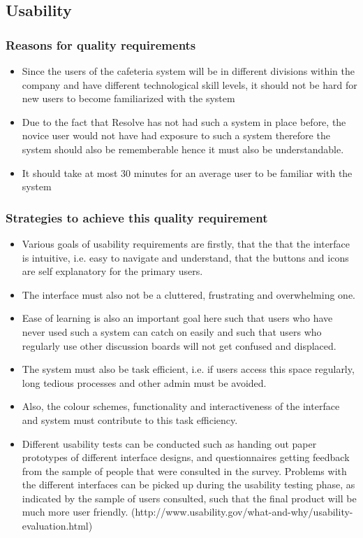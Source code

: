 \documentclass[a4paper,12pt]{article}
\begin{document}
\subsection{Usability}
 \subsubsection{Reasons for quality requirements}
 \begin{itemize}
 \item Since the users of the cafeteria system will be in different divisions within the company and have different technological skill levels, it should not be hard for new users to become familiarized with the system
 \item Due to the fact that Resolve has not had such a system in place before, the novice user would not have had exposure to such a system therefore the system should also be rememberable hence it must also be understandable. 
	\item It should take at most 30 minutes for an average user to be familiar with the system
 \end{itemize}
 \subsubsection{Strategies to achieve this quality requirement}
 \begin{itemize}
 \item Various goals of usability requirements are firstly, that the that the interface is intuitive, i.e. easy to navigate and understand, that the buttons and icons are self explanatory for the primary users.
 \item The interface must also not be a cluttered, frustrating and overwhelming one. 
 \item Ease of learning is also an important goal here such that users who have never used such a system can catch on easily and such that users who regularly use other discussion boards will not get confused and displaced. 
 \item The system must also be task efficient, i.e. if users access this space regularly, long tedious processes and other admin must be avoided.
\item Also, the colour schemes, functionality and interactiveness of the interface and system must contribute to this task efficiency. 
\item Different usability tests can be conducted such as handing out paper prototypes of different interface designs, and questionnaires getting feedback from the sample of people that were consulted in the survey. Problems with the different interfaces can be picked up during the usability testing phase, as indicated by the sample of users consulted, such that the final product will be much more user friendly. (http://www.usability.gov/what-and-why/usability-evaluation.html)
 \end{itemize}
\end{document}
